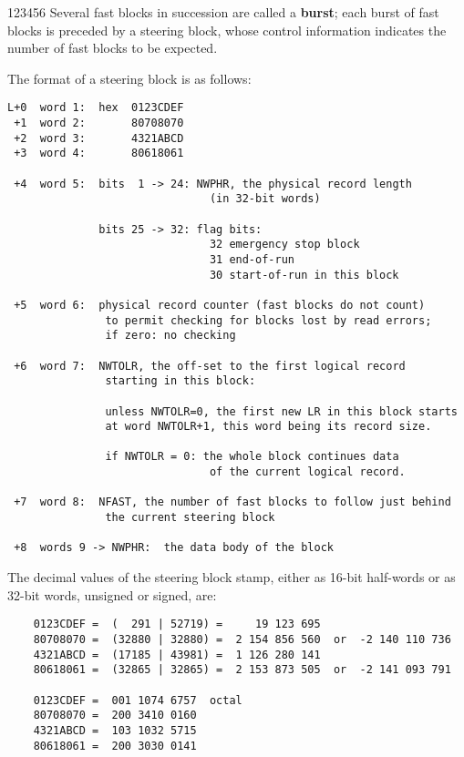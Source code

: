\begin{DLtt}{123456}
Several fast blocks in succession are called a {\bf burst};
each burst of fast blocks is preceded by a steering block,
whose control information indicates the number of fast blocks
to be expected.

The format of a steering block is as follows:

\begin{verbatim}
L+0  word 1:  hex  0123CDEF
 +1  word 2:       80708070
 +2  word 3:       4321ABCD
 +3  word 4:       80618061

 +4  word 5:  bits  1 -> 24: NWPHR, the physical record length
                               (in 32-bit words)

              bits 25 -> 32: flag bits:
                               32 emergency stop block
                               31 end-of-run
                               30 start-of-run in this block

 +5  word 6:  physical record counter (fast blocks do not count)
               to permit checking for blocks lost by read errors;
               if zero: no checking

 +6  word 7:  NWTOLR, the off-set to the first logical record
               starting in this block:

               unless NWTOLR=0, the first new LR in this block starts
               at word NWTOLR+1, this word being its record size.

               if NWTOLR = 0: the whole block continues data
                               of the current logical record.

 +7  word 8:  NFAST, the number of fast blocks to follow just behind
               the current steering block

 +8  words 9 -> NWPHR:  the data body of the block
\end{verbatim}

The decimal values of the steering block stamp,
either as 16-bit half-words or as 32-bit words, unsigned or signed,
are:

\begin{verbatim}
    0123CDEF =  (  291 | 52719) =     19 123 695
    80708070 =  (32880 | 32880) =  2 154 856 560  or  -2 140 110 736
    4321ABCD =  (17185 | 43981) =  1 126 280 141
    80618061 =  (32865 | 32865) =  2 153 873 505  or  -2 141 093 791

    0123CDEF =  001 1074 6757  octal
    80708070 =  200 3410 0160
    4321ABCD =  103 1032 5715
    80618061 =  200 3030 0141
\end{verbatim}


\end{DLtt}
